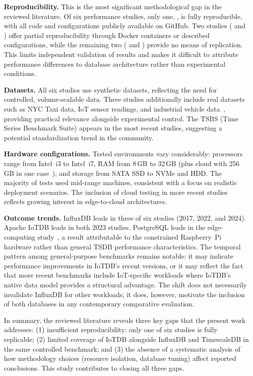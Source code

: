 \textbf{Reproducibility.} This is the most significant methodological gap in the reviewed
literature. Of six performance studies, only one, \cite{pereira2023mulletbench},
is fully reproducible, with all code and configurations publicly available on GitHub.
Two studies (\cite{lima2024avaliando} and \cite{wang2023iotdb}) offer partial reproducibility
through Docker containers or described configurations, while the remaining two
(\cite{shah2022performance} and \cite{naqvi2017influxdb}) provide no means of replication.
This limits independent validation of results and makes it difficult to attribute performance
differences to database architecture rather than experimental conditions.

\textbf{Datasets.} All six studies use synthetic datasets, reflecting the need for
controlled, volume-scalable data. Three studies additionally include real datasets such as
NYC Taxi data, IoT sensor readings, and industrial vehicle data~\citep{shah2022performance,
naqvi2017influxdb,wang2023iotdb}, providing practical relevance alongside experimental
control. The TSBS (Time Series Benchmark Suite) appears in the most recent studies,
suggesting a potential standardization trend in the community.

\textbf{Hardware configurations.} Tested environments vary considerably: processors range
from Intel~i3 to Intel~i7, RAM from 8\,GB to 32\,GB (plus cloud with 256\,GB in one
case~\citep{wang2023iotdb}), and storage from SATA SSD to NVMe and HDD. The majority of
tests used mid-range machines, consistent with a focus on realistic deployment scenarios.
The inclusion of cloud testing in more recent studies~\citep{pereira2023mulletbench,wang2023iotdb}
reflects growing interest in edge-to-cloud architectures.

\textbf{Outcome trends.} InfluxDB leads in three of six studies (2017, 2022, and 2024).
Apache IoTDB leads in both 2023 studies. PostgreSQL leads in the edge-computing
study~\citep{grzesik2020comparative}, a result attributable to the constrained Raspberry~Pi
hardware rather than general TSDB performance characteristics. The temporal pattern among
general-purpose benchmarks remains notable: it may indicate performance improvements in
IoTDB's recent versions, or it may reflect the fact that more recent benchmarks include
IoT-specific workloads where IoTDB's native data model provides a structural advantage.
The shift does not necessarily invalidate InfluxDB for other workloads; it does, however,
motivate the inclusion of both databases in any contemporary comparative evaluation.

In summary, the reviewed literature reveals three key gaps that the present work addresses:
(1) insufficient reproducibility: only one of six studies is fully replicable; (2) limited
coverage of IoTDB alongside InfluxDB and TimescaleDB in the same controlled benchmark; and
(3) the absence of a systematic analysis of how methodology choices (resource isolation,
database tuning) affect reported conclusions. This study contributes to closing all three gaps.
